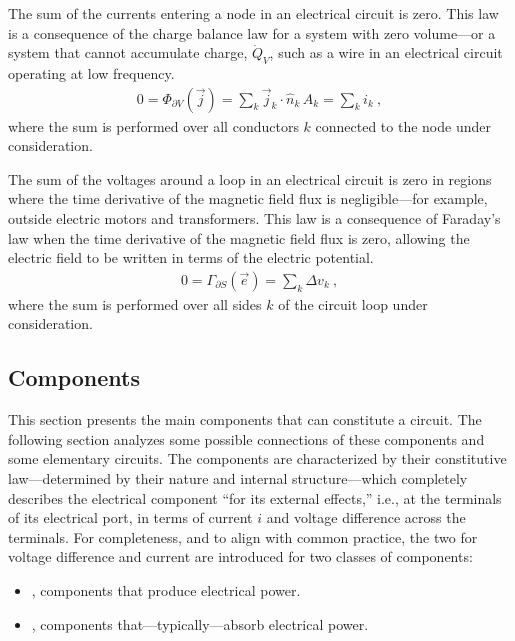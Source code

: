 \documentclass[letterpaper,10pt,english]{jupyterBook}
\begin{document}
\sphinxAtStartPar
{} The sum of the currents entering a node in an electrical circuit is zero. This law is a consequence of the charge balance law  for a system with zero volume—or a system that cannot accumulate charge, \(\dot{Q}_V\), such as a wire in an electrical circuit operating at low frequency.
\begin{equation*}
\begin{split}0 = \Phi_{\partial V}(\vec{j}) = \sum_{k} \vec{j}_k \cdot \hat{n}_k \, A_k = \sum_{k} i_k \ ,\end{split}
\end{equation*}
\sphinxAtStartPar
where the sum is performed over all conductors \(k\) connected to the node under consideration.

\sphinxAtStartPar
{} The sum of the voltages around a loop in an electrical circuit is zero in regions where the time derivative of the magnetic field flux is negligible—for example, outside electric motors and transformers. This law is a consequence of Faraday’s law when the time derivative of the magnetic field flux is zero, allowing the electric field to be written in terms of the electric potential.
\begin{equation*}
\begin{split}0 = \Gamma_{\partial S}(\vec{e}) = \sum_{k} \Delta v_k \ ,\end{split}
\end{equation*}
\sphinxAtStartPar
where the sum is performed over all sides \(k\) of the circuit loop under consideration.


\subsection{Components}
\label{\detokenize{ch/circuits-electric-components:components}}\label{\detokenize{ch/circuits-electric-components:classical-electromagnetism-circuits-electric-components}}
\sphinxAtStartPar
This section presents the main components that can constitute a circuit. The following section analyzes some possible connections of these components and some elementary circuits.
The components are characterized by their constitutive law—determined by their nature and internal structure—which completely describes the electrical component “for its external effects,” i.e., at the terminals of its electrical port, in terms of current \(i\) and voltage difference across the terminals. For completeness, and to align with common practice, the two  for voltage difference and current are introduced for two classes of components:
\begin{itemize}
\item {} 
\sphinxAtStartPar
{}, components that produce electrical power.

\item {} 
\sphinxAtStartPar
{}, components that—typically—absorb electrical power.

\end{itemize}
\end{document}
